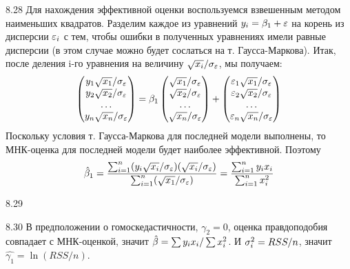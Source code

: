 \begin{solution}{{8.28}}
Для нахождения эффективной оценки воспользуемся взвешенным методом наименьших квадратов. Разделим каждое из уравнений $y_i = \beta_1 + \varepsilon$ на корень из дисперсии $\varepsilon_i$ с тем, чтобы ошибки в полученных уравнениях имели равные дисперсии (в этом случае можно будет сослаться на т. Гаусса-Маркова). Итак, после деления i-го уравнения на величину $\sqrt{x_i}/\sigma_{\varepsilon}$, мы получаем:
\[
\begin{pmatrix}
y_1 \sqrt{x_1}/\sigma_{\varepsilon} \\
y_2 \sqrt{x_2}/\sigma_{\varepsilon} \\
\ldots \\
y_n \sqrt{x_n}/\sigma_{\varepsilon} \\
\end{pmatrix} = \beta_1 \begin{pmatrix}
\sqrt{x_1}/\sigma_{\varepsilon} \\
\sqrt{x_2}/\sigma_{\varepsilon} \\
\ldots \\
\sqrt{x_n}/\sigma_{\varepsilon} \\
\end{pmatrix} + \begin{pmatrix}
\varepsilon_1 \sqrt{x_1}/\sigma_{\varepsilon} \\
\varepsilon_2 \sqrt{x_2}/\sigma_{\varepsilon} \\
\ldots \\
\varepsilon_n \sqrt{x_n}/\sigma_{\varepsilon} \\
\end{pmatrix}
\]
Поскольку условия т. Гаусса-Маркова для последней модели выполнены, то МНК-оценка для последней модели будет наиболее эффективной. Поэтому
\[
\hat{\beta}_1 = \frac{\sum_{i=1}^n (y_i \sqrt{x_i}/\sigma_{\varepsilon})(\sqrt{x_i}/\sigma_{\varepsilon})}{\sum_{i=1}^n (\sqrt{x_1}/\sigma_{\varepsilon})} = \frac{\sum_{i=1}^n y_i x_i}{\sum_{i=1}^n x_i^2}
\]
\end{solution}
\protect \hypertarget {soln:8.29}{}
\begin{solution}{{8.29}}
\end{solution}
\protect \hypertarget {soln:8.30}{}
\begin{solution}{{8.30}}
В предположении о гомоскедастичности, $\gamma_2=0$, оценка правдоподобия совпадает с МНК-оценкой, значит $\hat{\beta}=\sum y_i x_i/ \sum x_i^2$. И $\sigma^2_i=RSS/n$, значит $\hat{\gamma_1}=\ln(RSS/n)$.
\end{solution}
\protect \hypertarget {soln:8.31}{}
